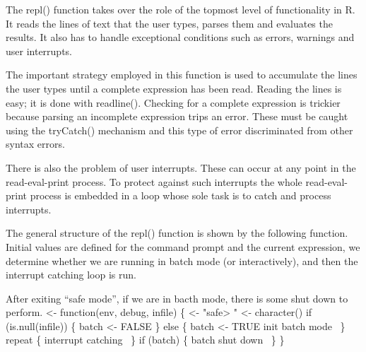 \documentclass[a4paper]{article}%
\begin{document}
The {\Tt{}repl()\nwendquote} function takes over the role of the topmost level of
functionality in R.  It reads the lines of text that the user types,
parses them and evaluates the results.  It also has to handle
exceptional conditions such as errors, warnings and user interrupts.

The important strategy employed in this function
is used to accumulate the lines the user types
until a complete expression has been read.  Reading the lines is easy;
it is done with {\Tt{}readline()\nwendquote}.  Checking for a complete expression
is trickier because parsing an incomplete expression trips an error.
These must be caught using the {\Tt{}tryCatch()\nwendquote} mechanism and this
type of error discriminated from other syntax errors.

There is also the problem of user interrupts.  These can occur at any
point in the read-eval-print process. To protect against such
interrupts the whole read-eval-print process is embedded in a loop
whose sole task is to catch and process interrupts.

The general structure of the {\Tt{}repl()\nwendquote} function is shown by the
following function.  Initial values are defined for the
command prompt and the current expression, we determine whether
we are running in batch mode (or interactively), and then the interrupt
catching loop is run.

After exiting ``safe mode'', if we are in bacth mode, there is some
shut down to perform.
\nwenddocs{}\endmoddef\nwstartdeflinemarkup{}\nwenddeflinemarkup
{} <- function(env, debug, infile) \{
     <- "safe> "
     <- character()
    if (is.null(infile)) \{
        batch <- FALSE
    \} else \{
        batch <- TRUE
        \LA{}init batch mode~{\nwtagstyle{}}\RA{}
    \}
    repeat \{
        \LA{}interrupt catching~{\nwtagstyle{}}\RA{}
    \}
    if (batch) \{
        \LA{}batch shut down~{\nwtagstyle{}}\RA{}
    \}
\}
\end{document}
